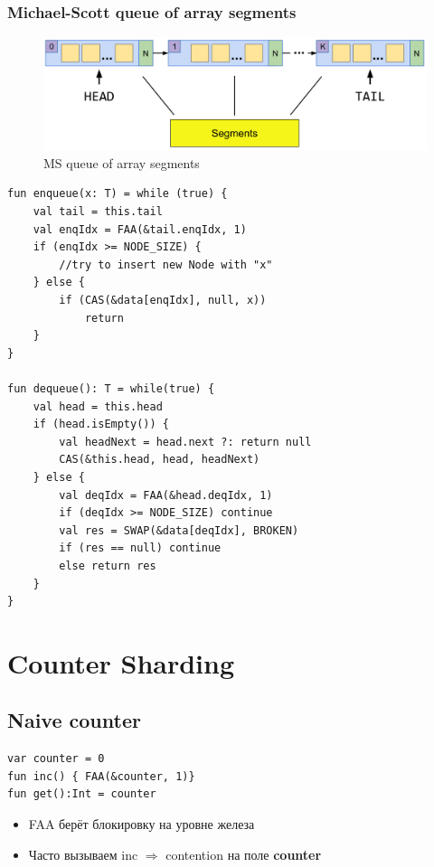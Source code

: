 \documentclass[10pt,a4paper,oneside,titlepage]{article}
\theoremstyle{plain}
\theoremstyle{defenition}
\begin{document}
\subsubsection{Michael-Scott queue of array segments}

\begin{figure}[h!]
	\centering
	\includegraphics[width=0.4\linewidth]{pictures/MSQueue1}
	\caption{MS queue of array segments}
	\label{fig:msqueue1}
\end{figure}

\begin{lstlisting}
fun enqueue(x: T) = while (true) {
    val tail = this.tail
    val enqIdx = FAA(&tail.enqIdx, 1)
    if (enqIdx >= NODE_SIZE) {
        //try to insert new Node with "x"
    } else {
        if (CAS(&data[enqIdx], null, x))
            return
    }
}

fun dequeue(): T = while(true) {
    val head = this.head
    if (head.isEmpty()) {
        val headNext = head.next ?: return null
        CAS(&this.head, head, headNext)
    } else {
        val deqIdx = FAA(&head.deqIdx, 1)
        if (deqIdx >= NODE_SIZE) continue
        val res = SWAP(&data[deqIdx], BROKEN)
        if (res == null) continue
        else return res
    }
}
\end{lstlisting}

\section{Counter Sharding}

\subsection{Naive counter}

\begin{lstlisting}
var counter = 0
fun inc() { FAA(&counter, 1)}
fun get():Int = counter
\end{lstlisting}

\begin{itemize}
	\item FAA берёт блокировку на уровне железа
	\item Часто вызываем inc $\Rightarrow$ contention на поле {\bfseries counter}
\end{itemize}
\end{document}
